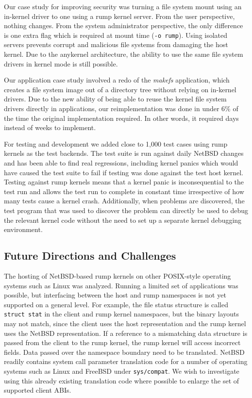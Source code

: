 Our case study for improving security was turning a file system
mount using an in-kernel driver to one using a rump kernel server.
From the user perspective, nothing changes.  From the system
administrator perspective, the only difference is one extra flag
which is required at mount time (\texttt{-o rump}).  Using isolated
servers prevents corrupt and malicious file systems from damaging
the host kernel.  Due to the anykernel architecture, the ability
to use the same file system drivers in kernel mode is still possible.

Our application case study involved a redo of the \textit{makefs}
application, which creates a file system image out of a directory
tree without relying on in-kernel drivers.  Due to the new ability of
being able to reuse the kernel file system drivers directly in
applications, our reimplementation was done in under 6\% of the
time the original implementation required.  In other words, it
required days instead of weeks to implement.

For testing and development we added close to 1,000 test cases using rump
kernels as the test backends.  The test suite is run against daily NetBSD
changes and has been able to find real regressions, including kernel
panics which would have caused the test suite to fail if testing was done
against the test host kernel.  Testing against rump kernels means that a
kernel panic is inconsequential to the test run and allows the test run to
complete in constant time irrespective of how many tests cause a kernel
crash.  Additionally, when problems are discovered, the test program
that was used to discover the problem can directly be used to debug
the relevant kernel code without the need to set up a separate kernel
debugging environment.

\subsection{Future Directions and Challenges}
\label{chap:future}

The hosting of NetBSD-based rump kernels on other POSIX-style operating
systems such as Linux was analyzed.  Running a limited set of applications
was possible, but interfacing between the host and rump namespaces is not
yet supported on a general level.  For example, the file status structure
is called \texttt{struct~stat} in the client and rump kernel namespaces,
but the binary layouts may not match, since the client uses the host
representation and the rump kernel uses the NetBSD representation.
If a reference to a mismatching data structure is passed from the client
to the rump kernel, the rump kernel will access incorrect fields.
Data passed over the namespace boundary need to be translated.  NetBSD
readily contains system call parameter translation code for a number of
operating systems such as Linux and FreeBSD under \texttt{sys/compat}.
We wish to investigate using this already existing translation code
where possible to enlarge the set of supported client ABIs.

